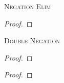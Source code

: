 \begin{multicols}{2}
\noindent\textsc{Negation Elim}\label{ProofRules-end}

\begin{proof}
	\open
		 \as{}
	\close
	 
\end{proof}
\bigskip


\noindent\textsc{Double Negation}

\begin{proof}
	 
\end{proof}

\begin{proof}
	 
\end{proof}


\vfill\null

\begin{comment}
\section{Derived rules for TFL}

\textsc{Dilemma}

\begin{proof}
	\have[m]{ab}{\meta{A}\eor\meta{B}}
	\have[n]{ac}{\meta{A}\eif\meta{C}}
	\have[p]{bc}{\meta{B}\eif\meta{C}}
	\have[\ ]{a}{\meta{C}} \by{DIL}{ab,ac,bc}
\end{proof}
\bigskip

\textsc{Modus Tollens}

\begin{proof}
	\have[m]{ab}{\meta{A}\eif\meta{B}}
	\have[n]{a}{\enot\meta{B}}
	\have[\ ]{b}{\enot\meta{A}} \by{MT}{ab,a}
\end{proof}
\bigskip

\textsc{Hypothetical Syllogism}

\begin{proof}
	\have[m]{ab}{\meta{A}\eif\meta{B}}
	\have[n]{bc}{\meta{B}\eif\meta{C}}
	\have[\ ]{ac}{\meta{A}\eif\meta{C}}\by{HS}{ab,bc}
\end{proof}

\end{comment}

\end{multicols}

